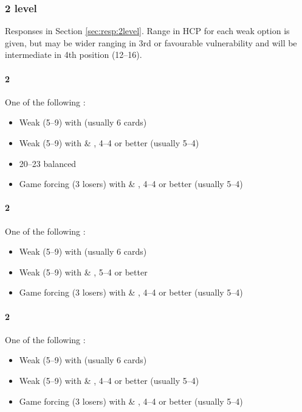 \documentclass[a4paper,14pt]{extarticle}
\begin{document}
\newpage 

\subsubsection{2 level}
\label{sec:open:2level}

Responses in Section \ref{sec:resp:2level}. Range in HCP for each weak option
is given, but may be wider ranging in 3rd or favourable vulnerability and will
be intermediate in 4th position (12--16).

\paragraph{2\clubs}
One of the following :
\begin{itemize}
\item Weak (5--9) with \diamonds (usually 6 cards)
\item Weak (5--9) with \hearts \& \spades, 4--4 or better (usually 5--4)
\item 20--23 balanced
\item Game forcing (3 losers) with \hearts \& \spades, 4--4 or better (usually 5--4)
\end{itemize}

\paragraph{2\diamonds}
One of the following :
\begin{itemize}
\item Weak (5--9) with \hearts (usually 6 cards)
\item Weak (5--9) with \spades \& \clubs, 5--4 or better 
\item Game forcing (3 losers) with \spades \& \clubs, 4--4 or better (usually 5--4)
\end{itemize}

\paragraph{2\hearts}
One of the following :
\begin{itemize}
\item Weak (5--9) with \spades (usually 6 cards)
\item Weak (5--9) with \clubs \& \diamonds, 4--4 or better (usually 5--4)
\item Game forcing (3 losers) with \clubs \& \diamonds, 4--4 or better (usually 5--4)
\end{itemize}
\end{document}
